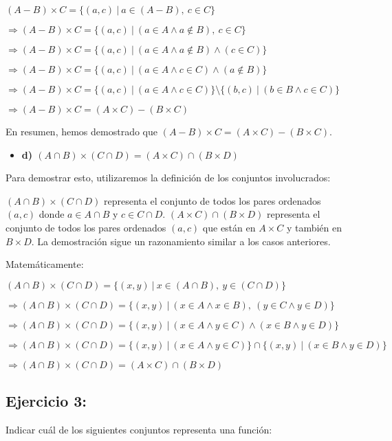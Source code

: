\documentclass{templateNote}
\begin{document}
$ (A - B) \times C = \{ (a, c) \ | \ a \in (A - B), \ c \in C \} $

$ \Rightarrow (A - B) \times C = \{ (a, c) \ | \ (a \in A \land a \notin B), \ c \in C \} $

$ \Rightarrow (A - B) \times C = \{ (a, c) \ | \ (a \in A \land a \notin B) \land (c \in C) \} $

$ \Rightarrow (A - B) \times C = \{ (a, c) \ | \ (a \in A \land c \in C) \land (a \notin B) \} $

$ \Rightarrow (A - B) \times C = \{ (a, c) \ | \ (a \in A \land c \in C) \} \setminus \{ (b, c) \ | \ (b \in B \land c \in C) \} $

$ \Rightarrow (A - B) \times C = (A \times C) - (B \times C) $

En resumen, hemos demostrado que $(A - B) \times C = (A \times C) - (B \times C)$.

\begin{itemize}
    \item \textbf{d) $(A \cap B) \times (C \cap D) = (A \times C) \cap (B \times D)$}
\end{itemize}

Para demostrar esto, utilizaremos la definición de los conjuntos involucrados:

$(A \cap B) \times (C \cap D)$ representa el conjunto de todos los pares ordenados $(a, c)$ donde $a \in A \cap B$ y $c \in C \cap D$.
$(A \times C) \cap (B \times D)$ representa el conjunto de todos los pares ordenados $(a, c)$ que están en $A \times C$ y también en $B \times D$.
La demostración sigue un razonamiento similar a los casos anteriores.

Matemáticamente:

$ (A \cap B) \times (C \cap D) = \{ (x, y) \ | \ x \in (A \cap B), \ y \in (C \cap D) \} $

$ \Rightarrow (A \cap B) \times (C \cap D) = \{ (x, y) \ | \ (x \in A \land x \in B), \ (y \in C \land y \in D) \} $

$ \Rightarrow (A \cap B) \times (C \cap D) = \{ (x, y) \ | \ (x \in A \land y \in C) \land (x \in B \land y \in D) \} $

$ \Rightarrow (A \cap B) \times (C \cap D) = \{ (x, y) \ | \ (x \in A \land y \in C) \} \cap \{ (x, y) \ | \ (x \in B \land y \in D) \} $

$ \Rightarrow (A \cap B) \times (C \cap D) = (A \times C) \cap (B \times D) $


\subsection*{\textbf{Ejercicio 3:}} Indicar cuál de los siguientes conjuntos representa una función: \\\\
\end{document}
